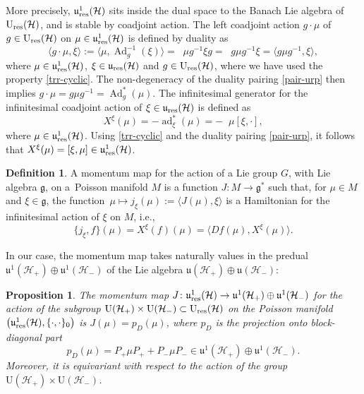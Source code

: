 \documentclass[10pt,a4paper]{amsart}
\newtheorem{prop}[thm]{Proposition}
\theoremstyle{definition}
\newtheorem{defn}[thm]{Definition}
\numberwithin{equation}{section}
\renewcommand{\H}{\mathcal{H}}
\newcommand{\g}{\mathfrak{g}}
\newcommand{\Up}{\mathrm{U}(\H_+)}\newcommand{\Um}{\mathrm{U}(\H_-)}
\newcommand{\Ur}{\mathrm{U}_{\textnormal{res}}(\H)}
\newcommand{\uup}{\mathfrak u(\H_+)}\newcommand{\uum}{\mathfrak u(\H_-)}
\newcommand{\uujp}{\mathfrak u^1(\H_+)}\newcommand{\uujm}{\mathfrak u^1(\H_-)}
\newcommand{\ur}{\mathfrak u_{\textnormal{res}}(\H)}
\newcommand{\urp}{\mathfrak u_{\textnormal{res}}^1(\H)}
\DeclareMathOperator{\Trr}{Tr_{res}}
\DeclareMathOperator{\ad}{ad}
\DeclareMathOperator{\Ad}{Ad}
\newcommand{\pb}{\{\cdot,\cdot\}}
\renewcommand{\to}{\rightarrow}
\newcommand{\be}{\begin{equation}}
\newcommand{\ee}{\end{equation}}
\begin{document}
More precisely, $\urp$ sits inside the dual space to the Banach Lie algebra of $\Ur$, and is stable by coadjoint action. The left coadjoint action $g\cdot \mu$ of $g\in \Ur$ on $\mu\in \urp$ is defined by duality as
\[
\langle g\cdot \mu , \xi \rangle := \bigl\langle \mu , \Ad_g^{-1}(\xi)\bigr\rangle = \Trr \mu g^{-1}\xi g = \Trr g \mu g^{-1} \xi = \bigl\langle g\mu g^{-1} , \xi \bigr\rangle,
\]
where $\mu \in \urp$, $\xi\in \ur$ and $g\in \Ur$, where we have used the property \eqref{trr-cyclic}. The non-degeneracy of the duality pairing \eqref{pair-urp} then implies
$
g\cdot \mu = g \mu g^{-1} = \Ad^*_g(\mu)$.
The infinitesimal generator  for the infinitesimal coadjoint action of $\xi \in \ur$ is defined as
\be\label{infinitesimal} X^\xi(\mu) = - \ad^*_\xi(\mu) = -\Trr \mu [\xi, \cdot],\ee
where $\mu\in\urp$. Using \eqref{trr-cyclic} and the duality pairing \eqref{pair-urp}, it follows that
$
 X^\xi(\mu) = [\xi,\mu]\in \urp$.
\begin{defn}
A momentum map for the action of a Lie group $G$, with Lie algebra $\g$, on a~Poisson manifold $M$ is a function $J\colon M\rightarrow \g^*$ such that, for $\mu\in M$ and $\xi \in \g$,
the function~${\mu\mapsto j_\xi(\mu) := \langle J(\mu) , \xi \rangle}$ is a Hamiltonian for the infinitesimal action of $\xi$ on $M$, i.e.,
\[
\{j_\xi, f\}(\mu) = X^\xi(f)(\mu) = \bigl\langle Df(\mu), X^\xi(\mu)\bigr\rangle.
\]
\end{defn}
In our case, the momentum map takes naturally values in the predual $\uujp\oplus\uujm$ of the Lie algebra $\uup\oplus\uum$:
\begin{prop}
The momentum map $J\colon\urp \to \uujp\oplus \uujm$ for the action of the subgroup $\Up\times\Um\subset \Ur$ on the Poisson manifold $\bigl(\urp, \pb_0\bigr)$ is
$J(\mu) = p_D(\mu)$,
where $p_D$ is the projection onto block-diagonal part
\[
 p_D(\mu) = P_+ \mu P_+ + P_- \mu P_- \in\uujp\oplus\uujm.\]
Moreover, it is equivariant with respect to the action of the group $\Up\times\Um$.
\end{prop}
\end{document}
